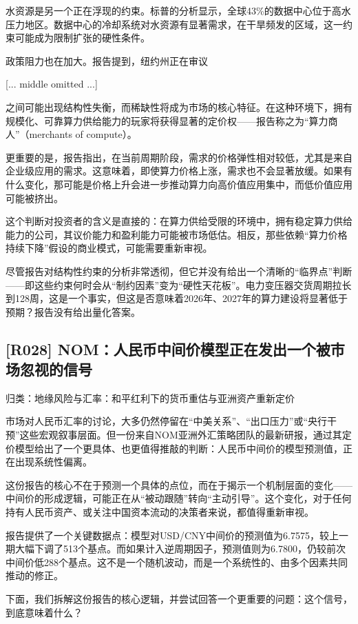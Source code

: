 \documentclass[11pt]{ctexart}
\begin{document}
水资源是另一个正在浮现的约束。标普的分析显示，全球43\%的数据中心位于高水压力地区。数据中心的冷却系统对水资源有显著需求，在干旱频发的区域，这一约束可能成为限制扩张的硬性条件。

政策阻力也在加大。报告提到，纽约州正在审议

[... middle omitted ...]

之间可能出现结构性失衡，而稀缺性将成为市场的核心特征。在这种环境下，拥有规模化、可靠算力供给能力的玩家将获得显著的定价权——报告称之为“算力商人”（merchants of compute）。

更重要的是，报告指出，在当前周期阶段，需求的价格弹性相对较低，尤其是来自企业级应用的需求。这意味着，即使算力价格上涨，需求也不会显著放缓。如果有什么变化，那可能是价格上升会进一步推动算力向高价值应用集中，而低价值应用可能被挤出。

这个判断对投资者的含义是直接的：在算力供给受限的环境中，拥有稳定算力供给能力的公司，其议价能力和盈利能力可能被市场低估。相反，那些依赖“算力价格持续下降”假设的商业模式，可能需要重新审视。

尽管报告对结构性约束的分析非常透彻，但它并没有给出一个清晰的“临界点”判断——即这些约束何时会从“制约因素”变为“硬性天花板”。电力变压器交货周期拉长到128周，这是一个事实，但这是否意味着2026年、2027年的算力建设将显著低于预期？报告没有给出量化答案。

\subsection{[R028] NOM：人民币中间价模型正在发出一个被市场忽视的信号}
{\small\color{refgray}归类：地缘风险与汇率：和平红利下的货币重估与亚洲资产重新定价}

市场对人民币汇率的讨论，大多仍然停留在“中美关系”、“出口压力”或“央行干预”这些宏观叙事层面。但一份来自NOM亚洲外汇策略团队的最新研报，通过其定价模型给出了一个更具体、也更值得推敲的判断：人民币中间价的模型预测值，正在出现系统性偏离。

这份报告的核心不在于预测一个具体的点位，而在于揭示一个机制层面的变化——中间价的形成逻辑，可能正在从“被动跟随”转向“主动引导”。这个变化，对于任何持有人民币资产、或关注中国资本流动的决策者来说，都值得重新审视。

报告提供了一个关键数据点：模型对USD/CNY中间价的预测值为6.7575，较上一期大幅下调了513个基点。而如果计入逆周期因子，预测值则为6.7800，仍较前次中间价低288个基点。这不是一个随机波动，而是一个系统性的、由多个因素共同推动的修正。

下面，我们拆解这份报告的核心逻辑，并尝试回答一个更重要的问题：这个信号，到底意味着什么？
\end{document}
